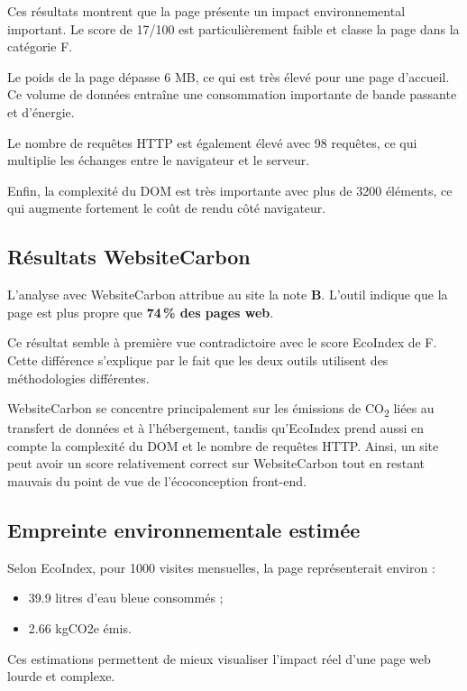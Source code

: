 \documentclass[11pt,a4paper]{article}
\begin{document}
Ces résultats montrent que la page présente un impact environnemental important. Le score de 17/100 est particulièrement faible et classe la page dans la catégorie F.

Le poids de la page dépasse 6 MB, ce qui est très élevé pour une page d'accueil. Ce volume de données entraîne une consommation importante de bande passante et d'énergie.

Le nombre de requêtes HTTP est également élevé avec 98 requêtes, ce qui multiplie les échanges entre le navigateur et le serveur.

Enfin, la complexité du DOM est très importante avec plus de 3200 éléments, ce qui augmente fortement le coût de rendu côté navigateur.

\subsection{Résultats WebsiteCarbon}

L'analyse avec WebsiteCarbon attribue au site la note \textbf{B}. L'outil indique que la page est plus propre que \textbf{74\,\% des pages web}.

Ce résultat semble à première vue contradictoire avec le score EcoIndex de F. Cette différence s'explique par le fait que les deux outils utilisent des méthodologies différentes.

WebsiteCarbon se concentre principalement sur les émissions de CO\textsubscript{2} liées au transfert de données et à l'hébergement, tandis qu'EcoIndex prend aussi en compte la complexité du DOM et le nombre de requêtes HTTP. Ainsi, un site peut avoir un score relativement correct sur WebsiteCarbon tout en restant mauvais du point de vue de l'écoconception front-end.

\subsection{Empreinte environnementale estimée}

Selon EcoIndex, pour 1000 visites mensuelles, la page représenterait environ :

\begin{itemize}
\item 39.9 litres d'eau bleue consommés ;
\item 2.66 kgCO2e émis.
\end{itemize}

Ces estimations permettent de mieux visualiser l'impact réel d'une page web lourde et complexe.
\end{document}

